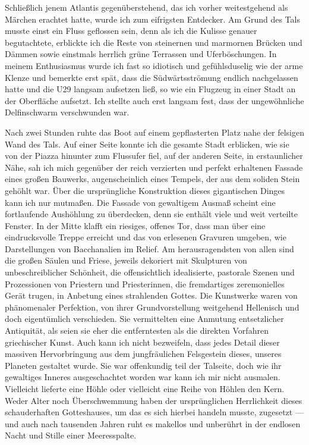 \documentclass[a4paper]{memoir}
\begin{document}
Schließlich jenem Atlantis gegenüberstehend, das ich vorher weitestgehend als Märchen erachtet hatte, wurde ich zum eifrigsten Entdecker. Am Grund des Tals musste einst ein Fluss geflossen sein, denn als ich die Kulisse genauer begutachtete, erblickte ich die Reste von steinernen und marmornen Brücken und Dämmen sowie einstmals herrlich grüne Terrassen und Uferböschungen. In meinem Enthusiasmus wurde ich fast so idiotisch und gefühlsduselig wie der arme Klenze und bemerkte erst spät, dass die Südwärtsströmung endlich nachgelassen hatte und die U29 langsam aufsetzen ließ, so wie ein Flugzeug in einer Stadt an der Oberfläche aufsetzt. Ich stellte auch erst langsam fest, dass der ungewöhnliche Delfinschwarm verschwunden war.

Nach zwei Stunden ruhte das Boot auf einem gepflasterten Platz nahe der felsigen Wand des Tals. Auf einer Seite konnte ich die gesamte Stadt erblicken, wie sie von der Piazza hinunter zum Flussufer fiel, auf der anderen Seite, in erstaunlicher Nähe, sah ich mich gegenüber der reich verzierten und perfekt erhaltenen Fassade eines großen Bauwerks, augenscheinlich eines Tempels, der aus dem soliden Stein gehöhlt war.
Über die ursprüngliche Konstruktion dieses gigantischen Dinges kann ich nur mutmaßen. Die Fassade von gewaltigem Ausmaß scheint eine fortlaufende Aushöhlung zu überdecken, denn sie enthält viele und weit verteilte Fenster.
In der Mitte klafft ein riesiges, offenes Tor, dass man über eine eindrucksvolle Treppe erreicht und das von erlesenen Gravuren umgeben, wie Darstellungen von Bacchanalien im Relief. Am herausragendsten von allen sind die großen Säulen und Friese, jeweils dekoriert mit Skulpturen von unbeschreiblicher Schönheit, die offensichtlich idealisierte, pastorale Szenen und Prozessionen von Priestern und Priesterinnen, die fremdartiges zeremonielles Gerät trugen, in Anbetung eines strahlenden Gottes. Die Kunstwerke waren von phänomenaler Perfektion, von ihrer Grundvorstellung weitgehend Hellenisch und doch eigentümlich verschieden. Sie vermittelten eine Anmutung entsetzlicher Antiquität, als seien sie eher die entferntesten als die direkten Vorfahren griechischer Kunst. Auch kann ich nicht bezweifeln, dass jedes Detail dieser massiven Hervorbringung aus dem jungfräulichen Felsgestein dieses, unseres Planeten gestaltet wurde. Sie war offenkundig teil der Talseite, doch wie ihr gewaltiges Inneres ausgeschachtet worden war kann ich mir nicht ausmalen. Vielleicht lieferte eine Höhle oder vielleicht eine Reihe von Höhlen den Kern. Weder Alter noch Überschwemmung haben der ursprünglichen Herrlichkeit dieses schauderhaften Gotteshauses, um das es sich hierbei handeln musste, zugesetzt --- und auch nach tausenden Jahren ruht es makellos und unberührt in der endlosen Nacht und Stille einer Meeresspalte.
\end{document}
